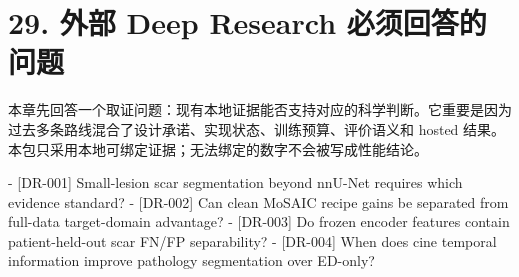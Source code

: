\section{29. 外部 Deep Research 必须回答的问题}

本章先回答一个取证问题：现有本地证据能否支持对应的科学判断。它重要是因为过去多条路线混合了设计承诺、实现状态、训练预算、评价语义和 hosted 结果。本包只采用本地可绑定证据；无法绑定的数字不会被写成性能结论。



- [DR-001] Small-lesion scar segmentation beyond nnU-Net requires which evidence standard?
- [DR-002] Can clean MoSAIC recipe gains be separated from full-data target-domain advantage?
- [DR-003] Do frozen encoder features contain patient-held-out scar FN/FP separability?
- [DR-004] When does cine temporal information improve pathology segmentation over ED-only?




\clearpage